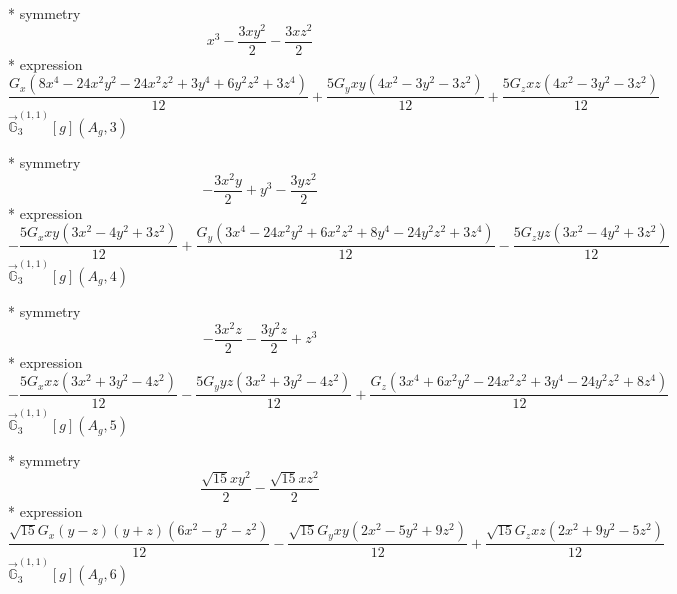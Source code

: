 \documentclass[fleqn,8pt]{jsarticle}
\begin{document}
\noindent\quad ** symmetry
\begin{dmath*}
x^{3} - \frac{3 x y^{2}}{2} - \frac{3 x z^{2}}{2}
\end{dmath*}
\noindent\quad ** expression
\begin{dmath*}
\frac{G_{x} \left(8 x^{4} - 24 x^{2} y^{2} - 24 x^{2} z^{2} + 3 y^{4} + 6 y^{2} z^{2} + 3 z^{4}\right)}{12} + \frac{5 G_{y} x y \left(4 x^{2} - 3 y^{2} - 3 z^{2}\right)}{12} + \frac{5 G_{z} x z \left(4 x^{2} - 3 y^{2} - 3 z^{2}\right)}{12}
\end{dmath*}
\noindent\quad $\vec{\mathbb{G}}_{3}^{(1,1)}[g](A_{g},3)$

\noindent\quad ** symmetry
\begin{dmath*}
- \frac{3 x^{2} y}{2} + y^{3} - \frac{3 y z^{2}}{2}
\end{dmath*}
\noindent\quad ** expression
\begin{dmath*}
- \frac{5 G_{x} x y \left(3 x^{2} - 4 y^{2} + 3 z^{2}\right)}{12} + \frac{G_{y} \left(3 x^{4} - 24 x^{2} y^{2} + 6 x^{2} z^{2} + 8 y^{4} - 24 y^{2} z^{2} + 3 z^{4}\right)}{12} - \frac{5 G_{z} y z \left(3 x^{2} - 4 y^{2} + 3 z^{2}\right)}{12}
\end{dmath*}
\noindent\quad $\vec{\mathbb{G}}_{3}^{(1,1)}[g](A_{g},4)$

\noindent\quad ** symmetry
\begin{dmath*}
- \frac{3 x^{2} z}{2} - \frac{3 y^{2} z}{2} + z^{3}
\end{dmath*}
\noindent\quad ** expression
\begin{dmath*}
- \frac{5 G_{x} x z \left(3 x^{2} + 3 y^{2} - 4 z^{2}\right)}{12} - \frac{5 G_{y} y z \left(3 x^{2} + 3 y^{2} - 4 z^{2}\right)}{12} + \frac{G_{z} \left(3 x^{4} + 6 x^{2} y^{2} - 24 x^{2} z^{2} + 3 y^{4} - 24 y^{2} z^{2} + 8 z^{4}\right)}{12}
\end{dmath*}
\noindent\quad $\vec{\mathbb{G}}_{3}^{(1,1)}[g](A_{g},5)$

\noindent\quad ** symmetry
\begin{dmath*}
\frac{\sqrt{15} x y^{2}}{2} - \frac{\sqrt{15} x z^{2}}{2}
\end{dmath*}
\noindent\quad ** expression
\begin{dmath*}
\frac{\sqrt{15} G_{x} \left(y - z\right) \left(y + z\right) \left(6 x^{2} - y^{2} - z^{2}\right)}{12} - \frac{\sqrt{15} G_{y} x y \left(2 x^{2} - 5 y^{2} + 9 z^{2}\right)}{12} + \frac{\sqrt{15} G_{z} x z \left(2 x^{2} + 9 y^{2} - 5 z^{2}\right)}{12}
\end{dmath*}
\noindent\quad $\vec{\mathbb{G}}_{3}^{(1,1)}[g](A_{g},6)$
\end{document}
